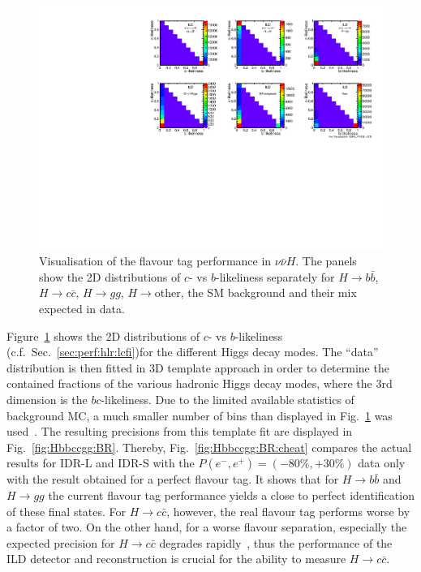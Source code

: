 \begin{figure}[htbp]
\begin{center}
 \includegraphics[width=\textwidth]{Performance/fig/IDRplot4.pdf}
\end{center}
\caption{Visualisation of the flavour tag performance in $\nu\bar{\nu} H$. The panels show the 2D distributions of $c$- vs $b$-likeliness separately for $H \to b\bar{b}$, $H \to c\bar{c}$, $H \to gg$, $H \to$other, the SM background and their mix expected in data.
}
\label{fig:Hbbccgg:likeli}
\end{figure}

Figure~\ref{fig:Hbbccgg:likeli} shows the 2D distributions of $c$- vs $b$-likeliness (c.f.\ Sec.~\ref{sec:perf:hlr:lcfi})for the different Higgs decay modes. The ``data'' distribution is then fitted in 3D template approach in order to determine the contained fractions of the various hadronic Higgs decay modes, where the 3rd dimension is the $bc$-likeliness. Due to the limited available statistics of background MC, a much smaller number of bins than displayed in Fig.~\ref{fig:Hbbccgg:likeli} was used~\cite{ILDNote:Hbbccgg}. The resulting precisions from this template fit are displayed in Fig.~\ref{fig:Hbbccgg:BR}. Thereby, Fig.~\ref{fig:Hbbccgg:BR:cheat} compares the actual results for IDR-L and IDR-S with the $P(e^-,e^+)=(-80\%,+30\%)$ data only with the  result obtained for a perfect flavour tag. It shows that for $H \to b\bar{b}$ and $H \to gg$ the current flavour tag performance yields a close to perfect identification of these final states. For $H \to c\bar{c}$, however, the
real flavour tag performs worse by a factor of two. On the other hand, for a worse flavour separation, especially the expected precision for $H \to c\bar{c}$ degrades rapidly~\cite{ILDNote:Hbbccgg},
thus the performance of the ILD detector and reconstruction is crucial for the ability to measure $H \to c\bar{c}$.

